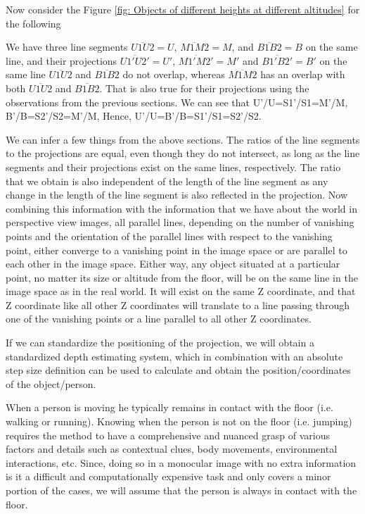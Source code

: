 \documentclass[12pt]{report}
\begin{document}
Now consider the Figure \ref{fig: Objects of different heights at different altitudes} for the following\newline

We have three line segments $\overline{U1U2}=U$, $\overline{M1M2} =M$, and $\overline{B1B2} =B$ on the same line, and their projections $\overline{U1'U2'}=U'$, $\overline{M1'M2'} =M'$ and $\overline{B1'B2'}=B'$ on the same line $\overline{U1U2}$ and $\overline{B1B2}$ do not overlap, whereas $\overline{M1M2}$ has an overlap with both $\overline{U1U2}$ and $\overline{B1B2}$. That is also true for their projections using the observations from the previous sections. We can see that U'/U=S1'/S1=M'/M, B'/B=S2'/S2=M'/M, Hence, U'/U=B'/B=S1'/S1=S2'/S2.\newline

We can infer a few things from the above sections. The ratios of the line segments to the projections are equal, even though they do not intersect, as long as the line segments and their projections exist on the same lines, respectively. The ratio that we obtain is also independent of the length of the line segment as any change in the length of the line segment is also reflected in the projection. Now combining this information with the information that we have about the world in perspective view images, all parallel lines, depending on the number of vanishing points and the orientation of the parallel lines with respect to the vanishing point, either converge to a vanishing point in the image space or are parallel to each other in the image space. Either way, any object situated at a particular point, no matter its size or altitude from the floor, will be on the same line in the image space as in the real world. It will exist on the same Z coordinate, and that Z coordinate like all other Z coordinates will translate to a line passing through one of the vanishing points or a line parallel to all other Z coordinates.\newline

If we can standardize the positioning of the projection, we will obtain a standardized depth estimating system, which in combination with an absolute step size definition can be used to calculate and obtain the position/coordinates of the object/person.\newline

When a person is moving he typically remains in contact with the floor (i.e. walking or running). Knowing when the person is not on the floor (i.e. jumping) requires the method to have a comprehensive and nuanced grasp of various factors and details such as contextual clues, body movements, environmental interactions, etc. Since, doing so in a monocular image with no extra information is it a difficult and computationally expensive task and only covers a minor portion of the cases, we will assume that the person is always in contact with the floor.\newline
\end{document}
